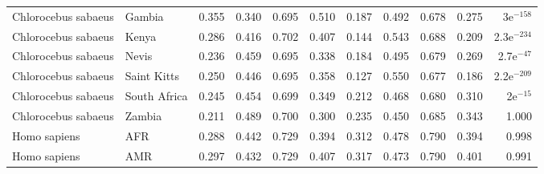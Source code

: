 \begin{center}
\begin{adjustbox}{width = 1\textwidth}
\begin{tabular}{llrrrrrrrrr}
 Chlorocebus sabaeus &                    Gambia &                              0.355 &                               0.340 &                 0.695 &                 0.510 &                              0.187 &                               0.492 &                 0.678 &                 0.275 &   3e$^{-158}$ \\
 Chlorocebus sabaeus &                     Kenya &                              0.286 &                               0.416 &                 0.702 &                 0.407 &                              0.144 &                               0.543 &                 0.688 &                 0.209 & 2.3e$^{-234}$ \\
 Chlorocebus sabaeus &                     Nevis &                              0.236 &                               0.459 &                 0.695 &                 0.338 &                              0.184 &                               0.495 &                 0.679 &                 0.269 &  2.7e$^{-47}$ \\
 Chlorocebus sabaeus &               Saint Kitts &                              0.250 &                               0.446 &                 0.695 &                 0.358 &                              0.127 &                               0.550 &                 0.677 &                 0.186 & 2.2e$^{-209}$ \\
 Chlorocebus sabaeus &              South Africa &                              0.245 &                               0.454 &                 0.699 &                 0.349 &                              0.212 &                               0.468 &                 0.680 &                 0.310 &    2e$^{-15}$ \\
 Chlorocebus sabaeus &                    Zambia &                              0.211 &                               0.489 &                 0.700 &                 0.300 &                              0.235 &                               0.450 &                 0.685 &                 0.343 &         1.000 \\
        Homo sapiens &                       AFR &                              0.288 &                               0.442 &                 0.729 &                 0.394 &                              0.312 &                               0.478 &                 0.790 &                 0.394 &         0.998 \\
        Homo sapiens &                       AMR &                              0.297 &                               0.432 &                 0.729 &                 0.407 &                              0.317 &                               0.473 &                 0.790 &                 0.401 &         0.991 \\

\end{tabular}
\end{adjustbox}
\end{center}
